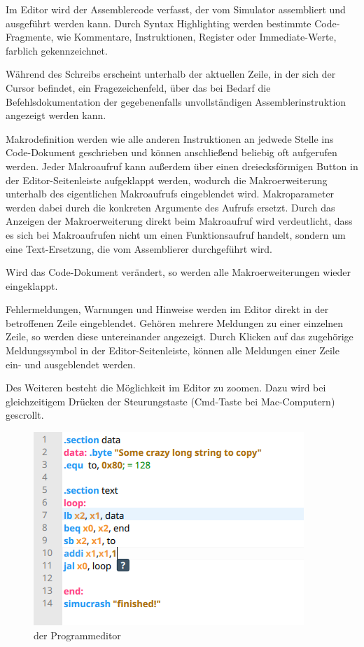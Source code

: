Im Editor wird der Assemblercode verfasst, der vom Simulator assembliert und ausgeführt werden kann.
Durch Syntax Highlighting werden bestimmte Code-Fragmente, wie Kommentare, Instruktionen,
Register oder Immediate-Werte, farblich gekennzeichnet.

Während des Schreibs erscheint unterhalb der aktuellen Zeile, in der sich der Cursor
befindet, ein Fragezeichenfeld, über das bei Bedarf die Befehlsdokumentation der
gegebenenfalls unvollständigen Assemblerinstruktion angezeigt werden kann.

Makrodefinition werden wie alle anderen Instruktionen an jedwede Stelle ins Code-Dokument geschrieben und können anschließend beliebig oft aufgerufen werden. Jeder Makroaufruf kann außerdem über einen dreiecksförmigen Button in der Editor-Seitenleiste aufgeklappt werden, wodurch die Makroerweiterung unterhalb des eigentlichen Makroaufrufs eingeblendet wird. Makroparameter werden dabei durch die konkreten Argumente des Aufrufs ersetzt. Durch das Anzeigen der Makroerweiterung direkt beim Makroaufruf wird verdeutlicht, dass es sich bei Makroaufrufen nicht um einen Funktionsaufruf handelt, sondern um eine Text-Ersetzung, die vom Assemblierer durchgeführt wird.

Wird das Code-Dokument verändert, so werden alle Makroerweiterungen wieder eingeklappt.

Fehlermeldungen, Warnungen und Hinweise werden im Editor direkt in der betroffenen Zeile eingeblendet. Gehören mehrere Meldungen zu einer einzelnen Zeile, so werden diese untereinander angezeigt. Durch Klicken auf das zugehörige Meldungssymbol in der Editor-Seitenleiste, können alle Meldungen einer Zeile ein- und ausgeblendet werden.

Des Weiteren besteht die Möglichkeit im Editor zu zoomen. Dazu wird bei gleichzeitigem
Drücken der Steurungstaste (Cmd-Taste bei Mac-Computern) gescrollt.

\begin{figure}[ht]
	\centering
  \includegraphics[scale=1]{Images/Editor}
	\caption{der Programmeditor}
	\label{Editor}
\end{figure}


